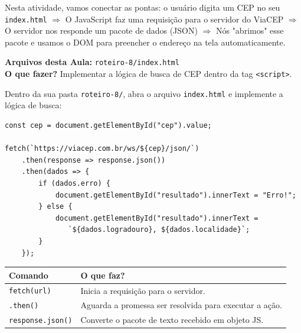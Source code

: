 \documentclass[12pt,a4paper]{article}
\begin{document}
\begin{boxAtividade}
Nesta atividade, vamos conectar as pontas: o usuário digita um CEP no seu \texttt{index.html} $\Rightarrow$ O JavaScript faz uma requisição para o servidor do ViaCEP $\Rightarrow$ O servidor nos responde um pacote de dados (JSON) $\Rightarrow$ Nós "abrimos" esse pacote e usamos o DOM para preencher o endereço na tela automaticamente.
\end{boxAtividade}

\begin{boxAtividade}
\begin{boxTabela}
\textbf{Arquivos desta Aula:} \texttt{roteiro-8/index.html} \\
\textbf{O que fazer?} Implementar a lógica de busca de CEP dentro da tag \texttt{<script>}.
\end{boxTabela}

Dentro da sua pasta \texttt{roteiro-8/}, abra o arquivo \texttt{index.html} e implemente a lógica de busca:

\begin{boxCodigo}
\begin{verbatim}
const cep = document.getElementById("cep").value;

fetch(`https://viacep.com.br/ws/${cep}/json/`)
    .then(response => response.json())
    .then(dados => {
        if (dados.erro) {
            document.getElementById("resultado").innerText = "Erro!";
        } else {
            document.getElementById("resultado").innerText = 
               `${dados.logradouro}, ${dados.localidade}`;
        }
    });
\end{verbatim}
\end{boxCodigo}
\end{boxAtividade}

\begin{boxAtividade}
\begin{center}
\begin{tabular}{|l|p{10cm}|}
\hline
\rowcolor{azulTitulo} \color{white} \textbf{Comando} & \color{white} \textbf{O que faz?} \\ \hline
\texttt{fetch(url)} & Inicia a requisição para o servidor. \\ \hline
\texttt{.then()} & Aguarda a promessa ser resolvida para executar a ação. \\ \hline
\texttt{response.json()} & Converte o pacote de texto recebido em objeto JS. \\ \hline
\end{tabular}
\end{center}
\end{boxAtividade}
\end{document}
